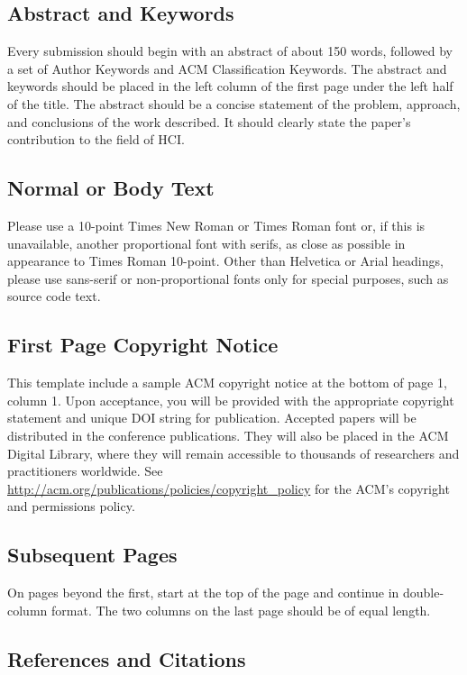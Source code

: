 \documentclass{sigchi}
\begin{document}
\subsection{Abstract and Keywords}

Every submission should begin with an abstract of about 150 words,
followed by a set of Author Keywords and ACM Classification
Keywords. The abstract and keywords should be placed in the left
column of the first page under the left half of the title. The
abstract should be a concise statement of the problem, approach, and
conclusions of the work described. It should clearly state the paper's
contribution to the field of HCI\@.

\subsection{Normal or Body Text}

Please use a 10-point Times New Roman or Times Roman font or, if this
is unavailable, another proportional font with serifs, as close as
possible in appearance to Times Roman 10-point. Other than Helvetica
or Arial headings, please use sans-serif or non-proportional fonts
only for special purposes, such as source code text.

\subsection{First Page Copyright Notice}
This template include a sample ACM copyright notice at the bottom of
page 1, column 1.  Upon acceptance, you will be provided with the
appropriate copyright statement and unique DOI string for publication.
Accepted papers will be distributed in the conference
publications. They will also be placed in the ACM Digital Library,
where they will remain accessible to thousands of researchers and
practitioners worldwide. See
\url{http://acm.org/publications/policies/copyright_policy} for the
ACM's copyright and permissions policy.

\subsection{Subsequent Pages}

On pages beyond the first, start at the top of the page and continue
in double-column format.  The two columns on the last page should be
of equal length.



\subsection{References and Citations}
\end{document}
